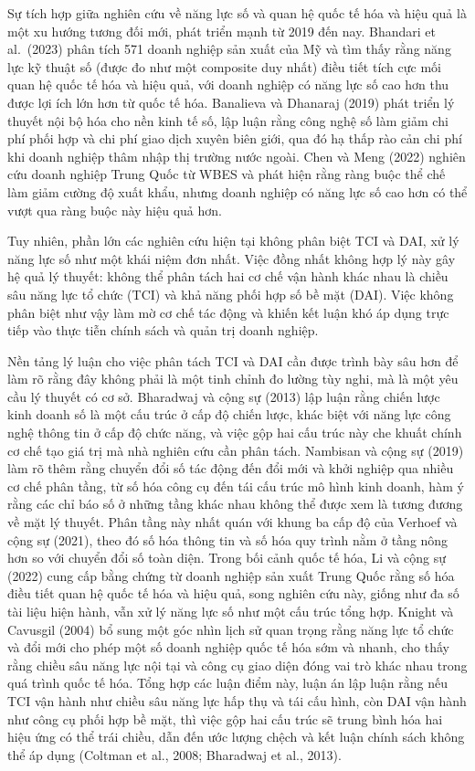 \documentclass[
  a4paper,
  13pt]{extreport}
\begin{document}
Sự tích hợp giữa nghiên cứu về năng lực số và quan hệ quốc tế hóa và
hiệu quả là một xu hướng tương đối mới, phát triển mạnh từ 2019 đến nay.
Bhandari et al.~(2023) phân tích 571 doanh nghiệp sản xuất của Mỹ và tìm
thấy rằng năng lực kỹ thuật số (được đo như một composite duy nhất) điều
tiết tích cực mối quan hệ quốc tế hóa và hiệu quả, với doanh nghiệp có
năng lực số cao hơn thu được lợi ích lớn hơn từ quốc tế hóa. Banalieva
và Dhanaraj (2019) phát triển lý thuyết nội bộ hóa cho nền kinh tế số,
lập luận rằng công nghệ số làm giảm chi phí phối hợp và chi phí giao
dịch xuyên biên giới, qua đó hạ thấp rào cản chi phí khi doanh nghiệp
thâm nhập thị trường nước ngoài. Chen và Meng (2022) nghiên cứu doanh
nghiệp Trung Quốc từ WBES và phát hiện rằng ràng buộc thể chế làm giảm
cường độ xuất khẩu, nhưng doanh nghiệp có năng lực số cao hơn có thể
vượt qua ràng buộc này hiệu quả hơn.

Tuy nhiên, phần lớn các nghiên cứu hiện tại không phân biệt TCI và DAI,
xử lý năng lực số như một khái niệm đơn nhất. Việc đồng nhất không hợp
lý này gây hệ quả lý thuyết: không thể phân tách hai cơ chế vận hành
khác nhau là chiều sâu năng lực tổ chức (TCI) và khả năng phối hợp số bề
mặt (DAI). Việc không phân biệt như vậy làm mờ cơ chế tác động và khiến
kết luận khó áp dụng trực tiếp vào thực tiễn chính sách và quản trị
doanh nghiệp.

Nền tảng lý luận cho việc phân tách TCI và DAI cần được trình bày sâu
hơn để làm rõ rằng đây không phải là một tinh chỉnh đo lường tùy nghi,
mà là một yêu cầu lý thuyết có cơ sở. Bharadwaj và cộng sự (2013) lập
luận rằng chiến lược kinh doanh số là một cấu trúc ở cấp độ chiến lược,
khác biệt với năng lực công nghệ thông tin ở cấp độ chức năng, và việc
gộp hai cấu trúc này che khuất chính cơ chế tạo giá trị mà nhà nghiên
cứu cần phân tách. Nambisan và cộng sự (2019) làm rõ thêm rằng chuyển
đổi số tác động đến đổi mới và khởi nghiệp qua nhiều cơ chế phân tầng,
từ số hóa công cụ đến tái cấu trúc mô hình kinh doanh, hàm ý rằng các
chỉ báo số ở những tầng khác nhau không thể được xem là tương đương về
mặt lý thuyết. Phân tầng này nhất quán với khung ba cấp độ của Verhoef
và cộng sự (2021), theo đó số hóa thông tin và số hóa quy trình nằm ở
tầng nông hơn so với chuyển đổi số toàn diện. Trong bối cảnh quốc tế
hóa, Li và cộng sự (2022) cung cấp bằng chứng từ doanh nghiệp sản xuất
Trung Quốc rằng số hóa điều tiết quan hệ quốc tế hóa và hiệu quả, song
nghiên cứu này, giống như đa số tài liệu hiện hành, vẫn xử lý năng lực
số như một cấu trúc tổng hợp. Knight và Cavusgil (2004) bổ sung một góc
nhìn lịch sử quan trọng rằng năng lực tổ chức và đổi mới cho phép một số
doanh nghiệp quốc tế hóa sớm và nhanh, cho thấy rằng chiều sâu năng lực
nội tại và công cụ giao diện đóng vai trò khác nhau trong quá trình quốc
tế hóa. Tổng hợp các luận điểm này, luận án lập luận rằng nếu TCI vận
hành như chiều sâu năng lực hấp thụ và tái cấu hình, còn DAI vận hành
như công cụ phối hợp bề mặt, thì việc gộp hai cấu trúc sẽ trung bình hóa
hai hiệu ứng có thể trái chiều, dẫn đến ước lượng chệch và kết luận
chính sách không thể áp dụng (Coltman et al., 2008; Bharadwaj et al.,
2013).
\end{document}
